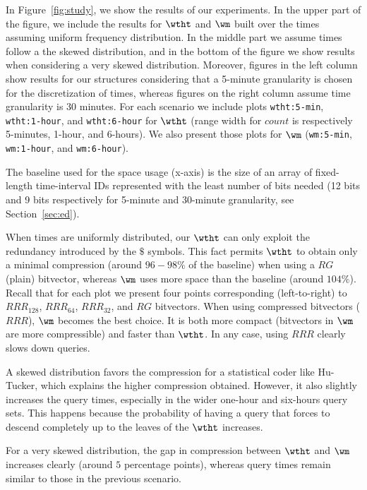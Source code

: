 In Figure~\ref{fig:study}, we show the results of our experiments. In the upper part of the figure, we 
include the results for $\wtht$ and $\wm$ built over the times assuming uniform frequency distribution.
In the middle part we assume times follow a the skewed distribution, and in the bottom of the figure we show
results when considering a very skewed distribution. Moreover, figures in the left column show results
for our structures considering that a 5-minute granularity is chosen for the discretization of times, whereas
figures on the right column assume time granularity is 30 minutes. For each scenario we include plots
\texttt{wtht:5-min}, \texttt{wtht:1-hour}, and \texttt{wtht:6-hour} for $\wtht$ (range width for $count$ is respectively
5-minutes, 1-hour, and 6-hours). We also present those plots for $\wm$ (\texttt{wm:5-min}, \texttt{wm:1-hour}, and \texttt{wm:6-hour}).

The baseline used for the space usage (x-axis) is the size of an array of
fixed-length time-interval IDs represented with the least number of bits needed (12 bits and 9 bits
respectively for 5-minute and 30-minute granularity, see Section~\ref{sec:ed}).
\medskip


When times are uniformly distributed, our $\wtht$ can only exploit the redundancy introduced by
the $\$$ symbols. This fact permits $\wtht$ to obtain only a minimal compression (around $96-98\%$ of the baseline)
when using a $RG$ (plain) bitvector, whereas $\wm$ uses more space than the baseline (around $104\%$).
Recall that for each plot we present four points corresponding (left-to-right) 
to $RRR_{128}$, $RRR_{64}$, $RRR_{32}$, and $RG$ bitvectors.
When using compressed  bitvectors ($RRR$), $\wm$ becomes the best choice. It is both more compact 
(bitvectors in $\wm$ are more compressible) and faster than $\wtht$. 
In any case, using $RRR$ clearly slows down queries.

A skewed distribution favors the compression for a statistical coder like Hu-Tucker,
which explains the higher compression obtained. However,
it also slightly increases the query times, especially in the wider
one-hour and six-hours query sets. This happens because the probability of having a query 
that forces to descend completely up to the leaves of the $\wtht$ increases.

For a very skewed distribution, the gap in compression between $\wtht$ and $\wm$ increases clearly (around 
$5$ percentage points), whereas query times remain similar to those in the previous scenario.

